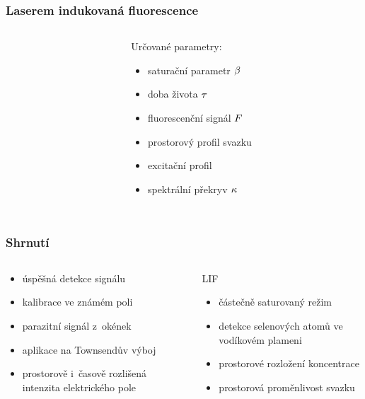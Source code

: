 \documentclass[10pt]{beamer}
\begin{document}
\begin{frame}
	\frametitle{Laserem indukovaná fluorescence}
	\small
	\begin{columns}
	\begin{column}{0.5\textwidth}
		
		
	\end{column}
	\begin{column}{0.5\textwidth}
		Určované parametry:
		\begin{itemize}
			\item saturační parametr $\beta$
			\item doba života $\tau$
			\item fluorescenční signál $F$
			\item prostorový profil svazku
			\item excitační profil
			\item spektrální překryv $\kappa$
		\end{itemize}
	\end{column}
	\end{columns}
\end{frame}

\section*{}

\begin{frame}
	\frametitle{Shrnutí}
	\begin{columns}[t]
	\begin{column}{0.5\textwidth}
		\EFISH
		\begin{itemize}
			\item úspěšná detekce signálu
			\item kalibrace ve známém poli
			\item parazitní signál z~okének
			\item aplikace na Townsendův výboj
			\item prostorově i~časově rozlišená intenzita elektrického pole
		\end{itemize}
	\end{column}
	\begin{column}{0.5\textwidth}
		LIF
		\begin{itemize}
			\item částečně saturovaný režim
			\item detekce selenových atomů ve vodíkovém plameni
			\item prostorové rozložení koncentrace \ce{Se}
			\item prostorová proměnlivost svazku
		\end{itemize}
	\end{column}
	\end{columns}
\end{frame}
\end{document}

